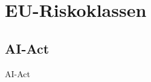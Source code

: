\documentclass[aspectratio=169,16pt,xcolor=table]{beamer}
\begin{document}
%


\section{EU-Riskoklassen}
\subsection{AI-Act}
\begin{frame}{AI-Act}
    \begin{center}
    \end{center}
  \end{frame}
\end{document}
